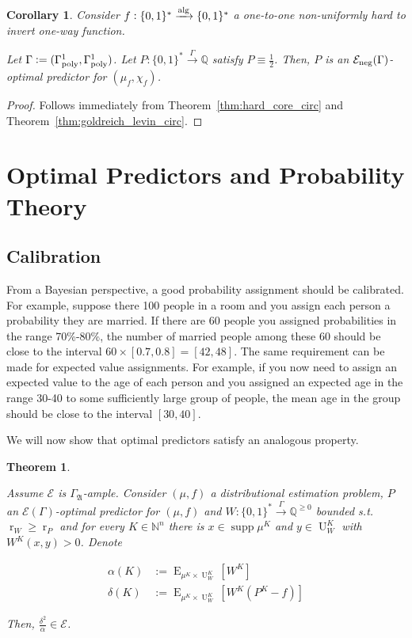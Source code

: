 \documentclass{article}
\numberwithin{equation}{section}
\theoremstyle{definition}
\theoremstyle{plain}
\newtheorem{theorem}{Theorem}[section]
\newtheorem{corollary}{Corollary}[section]
\newcommand{\Bool}{\{0,1\}}
\newcommand{\Words}{{\Bool^*}}
\DeclareMathOperator{\Supp}{supp}
\DeclareMathOperator{\E}{E}
\DeclareMathOperator{\R}{r}
\DeclareMathOperator{\Un}{U}
\newcommand{\Nats}{\mathbb{N}}
\newcommand{\Rats}{\mathbb{Q}}
\newcommand{\GrowA}{\Gamma_{\mathfrak{A}}}
\newcommand{\Fall}{\mathcal{E}}
\newcommand{\EG}{\Fall(\Gamma)}
\newcommand{\Alg}{\xrightarrow{\textnormal{alg}}}
\newcommand{\Scheme}{\xrightarrow{\Gamma}}
\begin{document}
\begin{corollary}

Consider $f: \Words \Alg \Words$ a one-to-one non-uniformly hard to invert one-way function.

Let $\Gamma:=(\Gamma_{\textnormal{poly}}^1,\Gamma_{\textnormal{poly}}^1)$. Let $P: \Words \Scheme \Rats$ satisfy $P \equiv \frac{1}{2}$. Then, $P$ is an $\Fall_{\textnormal{neg}}(\Gamma)$-optimal predictor for $(\mu_f, \chi_f)$.

\end{corollary}

\begin{proof}

Follows immediately from Theorem~\ref{thm:hard_core_circ} and Theorem~\ref{thm:goldreich_levin_circ}.
\end{proof}

\section{Optimal Predictors and Probability Theory}
\label{sec:probability}

\subsection{Calibration}

From a Bayesian perspective, a good probability assignment should be calibrated. For example, suppose there 100 people in a room and you assign each person a probability they are married. If there are 60 people you assigned probabilities in the range 70\%-80\%, the number of married people among these 60 should be close to the interval $60 \times [0.7, 0.8] = [42,48]$. The same requirement can be made for expected value assignments. For example, if you now need to assign an expected value to the age of each person and you assigned an expected age in the range 30-40 to some sufficiently large group of people, the mean age in the group should be close to the interval $[30,40]$. 

We will now show that optimal predictors satisfy an analogous property.

\begin{theorem}
\label{thm:calib}

Assume $\Fall$ is $\GrowA$-ample. Consider $(\mu,f)$ a distributional estimation problem, $P$ an $\EG$-optimal predictor for $(\mu,f)$ and ${W: \Words \Scheme \Rats^{\geq 0}}$ bounded s.t. $\R_W \geq \R_P$ and for every $K \in \Nats^n$ there is $x \in \Supp \mu^{K}$ and $y \in \Un_W^{K}$ with $W^{K}(x,y) > 0$. Denote

\begin{align*}
\alpha(K)&:=\E_{\mu^{K} \times \Un_W^{K}}[W^{K}] \\ 
\delta(K)&:=\E_{\mu^{K} \times \Un_W^{K}}[W^{K}(P^{K}-f)]
\end{align*} 

Then, $\frac{\delta^2}{\alpha} \in \Fall$.

\end{theorem}
\end{document}
